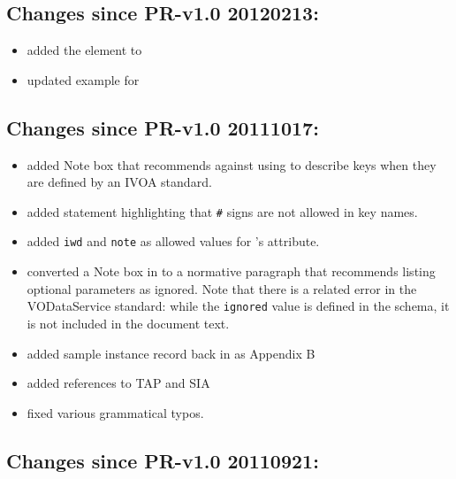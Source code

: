 \documentclass[11pt,a4paper]{ivoa}
\begin{document}
\subsection{Changes since PR-v1.0 20120213:}

\begin{itemize}
\item  added the  element to

\item  updated example for 

\end{itemize}

\subsection{Changes since PR-v1.0 20111017:}

\begin{itemize}
\item  added Note box that recommends against using
        to
       describe keys when they are defined by an IVOA standard.

\item  added statement highlighting that \verb|#| signs are
       not allowed in key names.

\item  added \texttt{iwd} and \texttt{note} as allowed values
       for 's
        attribute.

\item  converted a Note box in to a normative paragraph
       that recommends listing optional 
       parameters as ignored.  Note that there is a related error in
       the VODataService standard: while
       the \texttt{ignored} value is defined in
       the schema, it is not included in the document text.

\item  added sample 
       instance record back in as Appendix B

\item  added references to TAP and SIA

\item  fixed various grammatical typos.

\end{itemize}

\subsection{Changes since PR-v1.0 20110921:}
\end{document}
